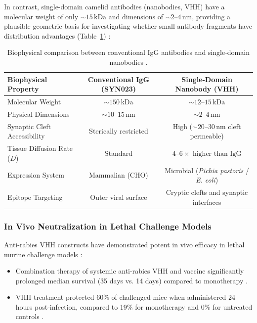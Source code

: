 \documentclass[12pt,a4paper]{article}
\begin{document}
In contrast, single-domain camelid antibodies (nanobodies, VHH) have a molecular weight of only $\sim 15\,\mathrm{kDa}$ and dimensions of $\sim 2\text{--}4\,\mathrm{nm}$, providing a plausible geometric basis for investigating whether small antibody fragments have distribution advantages (Table~\ref{tab:vhh_comparison}) \citep{terryn2016vhh}:

\begin{table}[htbp]
\centering
\small
\begin{tabular}{@{}lcc@{}}
\toprule
\textbf{Biophysical Property} & \textbf{Conventional IgG (SYN023)} & \textbf{Single-Domain Nanobody (VHH)} \\
\midrule
Molecular Weight & $\sim 150\,\mathrm{kDa}$ & $\sim 12\text{--}15\,\mathrm{kDa}$ \\
Physical Dimensions & $\sim 10\text{--}15\,\mathrm{nm}$ & $\sim 2\text{--}4\,\mathrm{nm}$ \\
Synaptic Cleft Accessibility & Sterically restricted & High ($\sim 20\text{--}30\,\mathrm{nm}$ cleft permeable) \\
Tissue Diffusion Rate ($D$) & Standard & $4\text{--}6\times\text{ higher than IgG}$ \\
Expression System & Mammalian (CHO) & Microbial (\textit{Pichia pastoris} / \textit{E. coli}) \\
Epitope Targeting & Outer viral surface & Cryptic clefts and synaptic interfaces \\
\bottomrule
\end{tabular}
\caption{Biophysical comparison between conventional IgG antibodies and single-domain nanobodies \citep{terryn2016vhh}.}\label{tab:vhh_comparison}
\end{table}

\subsubsection{In Vivo Neutralization in Lethal Challenge Models}

Anti-rabies VHH constructs have demonstrated potent in vivo efficacy in lethal murine challenge models \citep{terryn2016vhh}:
\begin{itemize}
    \item Combination therapy of systemic anti-rabies VHH and vaccine significantly prolonged median survival (35 days vs. 14 days) compared to monotherapy \citep{terryn2016vhh}.
    \item VHH treatment protected 60\% of challenged mice when administered 24 hours post-infection, compared to 19\% for monotherapy and 0\% for untreated controls \citep{terryn2016vhh}.
\end{itemize}
\end{document}
